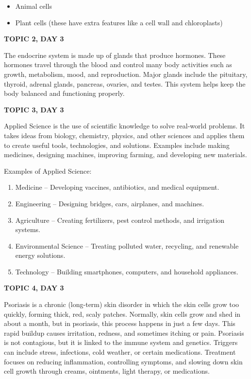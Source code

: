 {{{{{\begin{itemize}
    \item Animal cells
    \item Plant cells (these have extra features like a cell wall and chloroplasts)
\end{itemize}

\textbf{TOPIC 2, DAY 3}


The endocrine system is made up of glands that produce hormones. These hormones travel through the blood and control many body activities such as growth, metabolism, mood, and reproduction. Major glands include the pituitary, thyroid, adrenal glands, pancreas, ovaries, and testes. This system helps keep the body balanced and functioning properly.

\textbf{TOPIC 3, DAY 3}


Applied Science is the use of scientific knowledge to solve real-world problems. It takes ideas from biology, chemistry, physics, and other sciences and applies them to create useful tools, technologies, and solutions. Examples include making medicines, designing machines, improving farming, and developing new materials.


Examples of Applied Science:


\begin{enumerate}
    \item Medicine – Developing vaccines, antibiotics, and medical equipment.
    \item Engineering – Designing bridges, cars, airplanes, and machines.
    \item Agriculture – Creating fertilizers, pest control methods, and irrigation systems.
    \item Environmental Science – Treating polluted water, recycling, and renewable energy solutions.
    \item Technology – Building smartphones, computers, and household appliances.
\end{enumerate}

\textbf{TOPIC 4, DAY 3}


Psoriasis is a chronic (long-term) skin disorder in which the skin cells grow too quickly, forming thick, red, scaly patches. Normally, skin cells grow and shed in about a month, but in psoriasis, this process happens in just a few days. This rapid buildup causes irritation, redness, and sometimes itching or pain. Psoriasis is not contagious, but it is linked to the immune system and genetics. Triggers can include stress, infections, cold weather, or certain medications. Treatment focuses on reducing inflammation, controlling symptoms, and slowing down skin cell growth through creams, ointments, light therapy, or medications.

}}}}}
